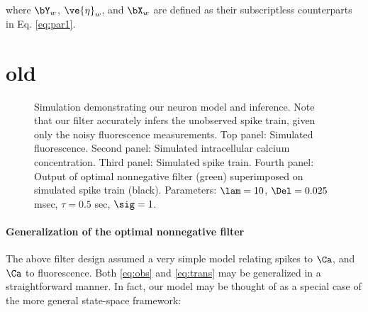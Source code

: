 \documentclass[12pt]{article}
\newcommand{\zzz}{z}
\newcommand{\xT}{\ve{C}}
\newcommand{\zT}{\ve{n}}
\newcommand{\lT}{\ve{\lam}}
\begin{document}
\noindent where $\bY_w$, $\ve{\eta}_w$, and $\bX_w$ are defined as their subscriptless counterparts in Eq. \eqref{eq:par1}.



\section{old}


\begin{figure}
\caption{Simulation demonstrating our neuron model and inference. Note that our filter accurately infers the unobserved spike train, given only the noisy fluorescence measurements.  Top panel: Simulated fluorescence. Second panel: Simulated intracellular calcium concentration. Third panel: Simulated spike train.  Fourth panel: Output of optimal nonnegative filter (green) superimposed on simulated spike train (black).  Parameters: $\lam=10$, $\Del=0.025$ msec, $\tau=0.5$ sec, $\sig=1$.} \label{fig:demo}
\end{figure}

\paragraph{Generalization of the optimal nonnegative filter}

The above filter design assumed a very simple model relating spikes to $\Ca$, and $\Ca$ to fluorescence.  Both \eqref{eq:obs} and \eqref{eq:trans} may be generalized in a straightforward manner. In fact, our model may be thought of as a special case of the more general state-space framework:
\end{document}

